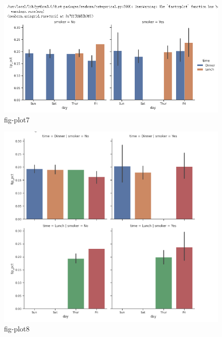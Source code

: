 \documentclass{article}
\begin{document}
\begin{figure}[htpb]
	\centering
	\includegraphics[width=\linewidth]{fig/p7}
	\caption{fig-plot7}
	\label{fig-shili7}
\end{figure}
\begin{figure}[htpb]
	\centering
	\includegraphics[width=\linewidth]{fig/p8}
	\caption{fig-plot8}
	\label{fig-shili8}
\end{figure}
\end{document}
